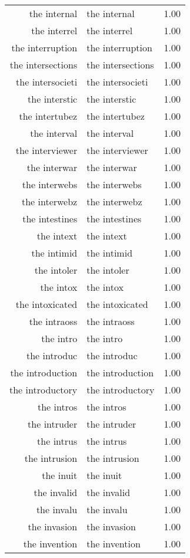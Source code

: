 \begin{table}[ht]
\begin{tabular}{rlr}
  the internal & the internal & 1.00 \\ 
  the interrel & the interrel & 1.00 \\ 
  the interruption & the interruption & 1.00 \\ 
  the intersections & the intersections & 1.00 \\ 
  the intersocieti & the intersocieti & 1.00 \\ 
  the interstic & the interstic & 1.00 \\ 
  the intertubez & the intertubez & 1.00 \\ 
  the interval & the interval & 1.00 \\ 
  the interviewer & the interviewer & 1.00 \\ 
  the interwar & the interwar & 1.00 \\ 
  the interwebs & the interwebs & 1.00 \\ 
  the interwebz & the interwebz & 1.00 \\ 
  the intestines & the intestines & 1.00 \\ 
  the intext & the intext & 1.00 \\ 
  the intimid & the intimid & 1.00 \\ 
  the intoler & the intoler & 1.00 \\ 
  the intox & the intox & 1.00 \\ 
  the intoxicated & the intoxicated & 1.00 \\ 
  the intraoss & the intraoss & 1.00 \\ 
  the intro & the intro & 1.00 \\ 
  the introduc & the introduc & 1.00 \\ 
  the introduction & the introduction & 1.00 \\ 
  the introductory & the introductory & 1.00 \\ 
  the intros & the intros & 1.00 \\ 
  the intruder & the intruder & 1.00 \\ 
  the intrus & the intrus & 1.00 \\ 
  the intrusion & the intrusion & 1.00 \\ 
  the inuit & the inuit & 1.00 \\ 
  the invalid & the invalid & 1.00 \\ 
  the invalu & the invalu & 1.00 \\ 
  the invasion & the invasion & 1.00 \\ 
  the invention & the invention & 1.00 \\ 

\end{tabular}
\end{table}
